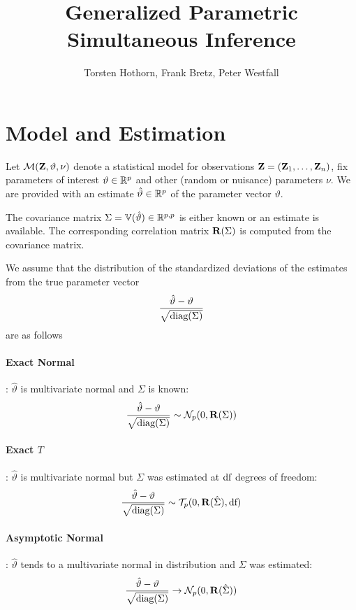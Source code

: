 \documentclass{article}
\title{Generalized Parametric Simultaneous Inference}
\author{Torsten Hothorn, Frank Bretz, Peter Westfall}
\begin{document}
\maketitle

\section{Model and Estimation}

Let $\mathcal{M}(\mathbf{Z}, \vartheta, \nu)$ denote a statistical model
for observations $\mathbf{Z} = (\mathbf{Z}_1, \dots, \mathbf{Z}_n)$, fix 
parameters of interest $\vartheta \in \mathbb{R}^p$ and other (random or nuisance)
parameters $\nu$. We are provided with an estimate $\hat{\vartheta} \in \mathbb{R}^p$
of the parameter vector $\vartheta$.

The covariance matrix $\Sigma = \mathbb{V}(\hat{\vartheta}) \in \mathbb{R}^{p,p}$ is 
either known or an estimate is available. The 
corresponding correlation matrix $\mathbf{R}(\Sigma)$ is 
computed from the covariance matrix.

We assume that the distribution of the 
standardized deviations of the estimates from the true 
parameter vector
\begin{eqnarray*}
\frac{\hat{\vartheta} - \vartheta}{\sqrt{\text{diag}(\Sigma)}}
\end{eqnarray*}
are as follows

\paragraph{Exact Normal}: $\hat{\vartheta}$ is multivariate normal and $\Sigma$ is known:
\begin{eqnarray*}
\frac{\hat{\vartheta} - \vartheta}{\sqrt{\text{diag}(\Sigma)}} \sim \mathcal{N}_p(0, \mathbf{R}(\Sigma))
\end{eqnarray*}

\paragraph{Exact $T$}: $\hat{\vartheta}$ is multivariate normal but $\Sigma$ was estimated
at $\text{df}$ degrees of freedom:
\begin{eqnarray*}
\frac{\hat{\vartheta} - \vartheta}{\sqrt{\text{diag}(\Sigma)}} \sim 
    \mathcal{T}_p(0, \mathbf{R}(\hat{\Sigma}), \text{df})
\end{eqnarray*}

\paragraph{Asymptotic Normal}: $\hat{\vartheta}$ tends to a multivariate normal in distribution
and $\Sigma$ was estimated:
\begin{eqnarray*}
\frac{\hat{\vartheta} - \vartheta}{\sqrt{\text{diag}(\Sigma)}} \rightarrow
    \mathcal{N}_p(0, \mathbf{R}(\hat{\Sigma}))
\end{eqnarray*}
\end{document}
